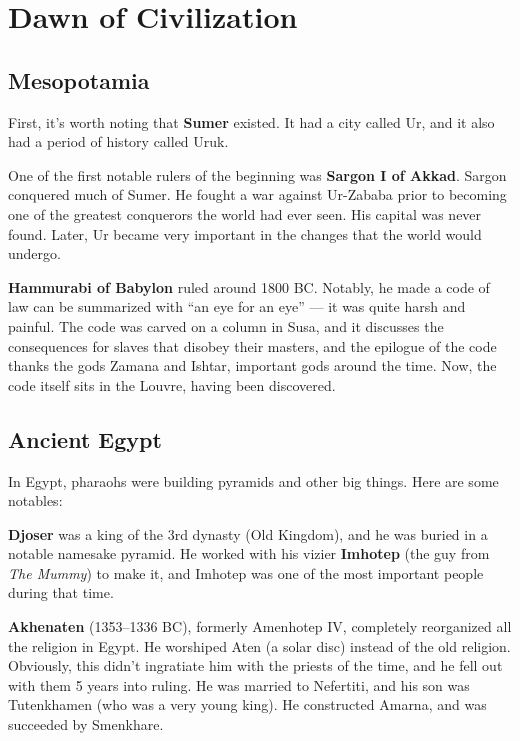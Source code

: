 \chapter{Dawn of Civilization}

\section{Mesopotamia}

First, it's worth noting that \textbf{Sumer} existed.
It had a city called Ur, and it also had a period of history called Uruk.

One of the first notable rulers of the beginning was \textbf{Sargon I of Akkad}.
Sargon conquered much of Sumer.
He fought a war against Ur-Zababa prior to becoming one of the greatest conquerors the world had ever seen.
His capital was never found.
Later, Ur became very important in the changes that the world would undergo.

\textbf{Hammurabi of Babylon} ruled around 1800 BC\@.
Notably, he made a code of law can be summarized with ``an eye for an eye'' --- it was quite harsh and painful.
The code was carved on a column in Susa,
and it discusses the consequences for slaves that disobey their masters,
and the epilogue of the code thanks the gods Zamana and Ishtar, important gods around the time.
Now, the code itself sits in the Louvre, having been discovered.



\section{Ancient Egypt}

In Egypt, pharaohs were building pyramids and other big things. Here are some notables:

\textbf{Djoser} was a king of the 3rd dynasty (Old Kingdom),
and he was buried in a notable namesake pyramid.
He worked with his vizier \textbf{Imhotep} (the guy from \textit{The Mummy})
to make it, and Imhotep was one of the most important people during that time.

\textbf{Akhenaten} (1353--1336 BC), formerly Amenhotep IV, completely reorganized all the religion in Egypt.
He worshiped Aten (a solar disc) instead of the old religion.
Obviously, this didn't ingratiate him with the priests of the time, and he fell out with them 5 years into ruling.
He was married to Nefertiti, and his son was Tutenkhamen (who was a very young king).
He constructed Amarna, and was succeeded by Smenkhare.


